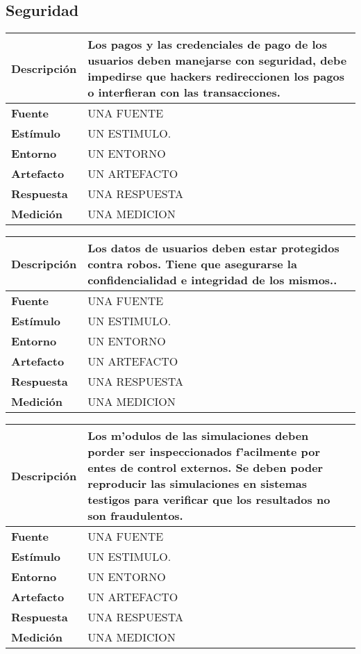 \subsection{Seguridad}

\begin{center}
  \begin{tabular}{| l | p{10cm} | }
    \hline
  \textbf{Descripción} & Los pagos y las credenciales de pago de los usuarios deben manejarse con seguridad, debe impedirse que hackers redireccionen los pagos o interfieran con las transacciones.\\  \hline
  \textbf{Fuente} & UNA FUENTE\\  \hline
  \textbf{Estímulo} & UN ESTIMULO.\\  \hline
  \textbf{Entorno} & UN ENTORNO\\  \hline
  \textbf{Artefacto} & UN ARTEFACTO\\  \hline
  \textbf{Respuesta} & UNA RESPUESTA\\  \hline
  \textbf{Medición} & UNA MEDICION\\  \hline
  \end{tabular}
\end{center} 

\begin{center}
  \begin{tabular}{| l | p{10cm} | }
    \hline
  \textbf{Descripción} & Los datos de usuarios deben estar protegidos contra robos. Tiene que asegurarse la confidencialidad e integridad de los mismos.. \\  \hline
  \textbf{Fuente} & UNA FUENTE\\  \hline
  \textbf{Estímulo} & UN ESTIMULO.\\  \hline
  \textbf{Entorno} & UN ENTORNO\\  \hline
  \textbf{Artefacto} & UN ARTEFACTO\\  \hline
  \textbf{Respuesta} & UNA RESPUESTA\\  \hline
  \textbf{Medición} & UNA MEDICION\\  \hline
  \end{tabular}
\end{center} 

\begin{center}
  \begin{tabular}{| l | p{10cm} | }
    \hline
  \textbf{Descripción} & Los m'odulos de las simulaciones deben porder ser inspeccionados f'acilmente por entes de control externos. Se deben poder reproducir las simulaciones en sistemas testigos para verificar que los resultados no son fraudulentos.\\  \hline
  \textbf{Fuente} & UNA FUENTE\\  \hline
  \textbf{Estímulo} & UN ESTIMULO.\\  \hline
  \textbf{Entorno} & UN ENTORNO\\  \hline
  \textbf{Artefacto} & UN ARTEFACTO\\  \hline
  \textbf{Respuesta} & UNA RESPUESTA\\  \hline
  \textbf{Medición} & UNA MEDICION\\  \hline
  \end{tabular}
\end{center} 

